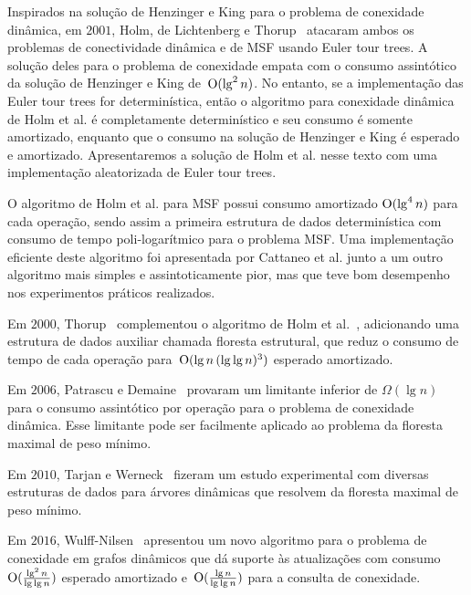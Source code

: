 Inspirados na solução de Henzinger e King para o problema de conexidade dinâmica, em $2001$, Holm, de Lichtenberg e Thorup~\cite{poly_log} atacaram ambos os problemas de conectividade dinâmica e de MSF usando Euler tour trees.
A solução deles para o problema de conexidade empata com o consumo assintótico da solução de Henzinger e King de~$\mathrm{O}(\lg^2 n)$.
No entanto, se a implementação das Euler tour trees for determinística, então o algoritmo para conexidade dinâmica de Holm et al. é completamente determinístico e seu consumo é somente amortizado,
enquanto que o consumo na solução de Henzinger e King é esperado e amortizado. 
Apresentaremos a solução de Holm et al. nesse texto com uma implementação aleatorizada de Euler tour trees.

O algoritmo de Holm et al. para MSF possui consumo amortizado $\mathrm{O}(\lg^4 n)$ para cada operação, sendo assim a primeira estrutura de dados determinística com consumo de tempo poli-logarítmico para o problema MSF. Uma implementação eficiente deste algoritmo foi apresentada por Cattaneo et al. \cite{xpstudy2002} junto a um outro algoritmo mais simples e assintoticamente pior, mas que teve bom desempenho nos experimentos práticos realizados.

Em $2000$, Thorup~\cite{Thorup2000} complementou o algoritmo de Holm et al.~\cite{poly_log}, adicionando uma estrutura de dados auxiliar chamada floresta estrutural, que reduz o consumo de tempo de cada operação para~$\mathrm{O}(\lg n\, (\lg\lg n)^3)$ esperado amortizado.

Em $2006$, Patrascu e Demaine~\cite{lowerBoundPatrascu} provaram um limitante inferior de $\Omega(\lg n)$ para o consumo assintótico por operação para o problema de conexidade dinâmica.
Esse limitante pode ser facilmente aplicado ao problema da floresta maximal de peso mínimo.

Em $2010$, Tarjan e Werneck~\cite{tarjanWerneck2010} fizeram um estudo experimental com diversas estruturas de dados para árvores dinâmicas que resolvem  da floresta maximal de peso mínimo.

Em $2016$, Wulff-Nilsen~\cite{Wulff-Nilsen2016} apresentou um novo algoritmo para o problema de conexidade em grafos dinâmicos que dá suporte às atualizações com consumo~$\mathrm{O}(\frac{\lg^2 n}{\lg \lg n})$ esperado amortizado e~$\mathrm{O}(\frac{\lg n}{\lg \lg n})$ para a consulta de conexidade.

